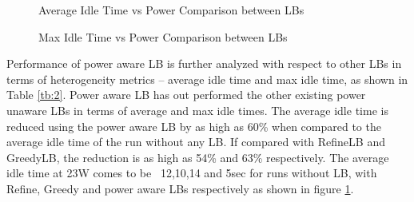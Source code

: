 \begin{figure}
\centering
\caption{Average Idle Time vs Power Comparison between LBs}
\label{fig:avg_times_final_vs_power}
\end{figure}

\begin{figure}
\centering
\caption{Max Idle Time vs Power Comparison between LBs}
\label{fig:idle_times_final_vs_power}
\end{figure}


Performance of power aware LB is further analyzed with respect to other LBs in
terms of heterogeneity metrics – average idle time and max idle time, as shown
in Table \ref{tb:2}. Power aware LB has out performed the other existing power
unaware LBs in terms of average and max idle times. The average idle time is
reduced using the power aware LB by as high as 60\% when compared to the
average idle time of the run without any LB. If compared with RefineLB and
GreedyLB, the reduction is as high as 54\% and 63\% respectively. The average
idle time at 23W comes to be ~12,10,14 and 5sec for runs without LB, with
Refine, Greedy and power aware LBs respectively as shown in figure
\ref{fig:avg_times_final_vs_power}.

